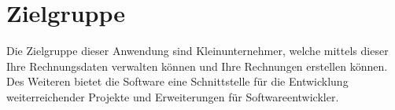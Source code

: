 
\section{Zielgruppe}

Die Zielgruppe dieser Anwendung sind Kleinunternehmer, welche mittels dieser Ihre Rechnungsdaten verwalten können und Ihre Rechnungen erstellen können. Des Weiteren bietet die Software eine Schnittstelle für die Entwicklung weiterreichender Projekte und Erweiterungen für Softwareentwickler.

